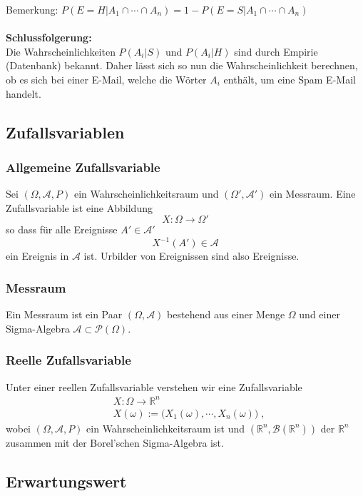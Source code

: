 \documentclass[a4paper]{article}
\begin{document}
Bemerkung: $P(E=H |  A_1 \cap \cdots \cap A_n) = 1- P(E=S |  A_1 \cap \cdots \cap A_n) $\\\\
\textbf{Schlussfolgerung:}\\
Die Wahrscheinlichkeiten $P(A_i | S)$ und $P(A_i | H) $ sind durch Empirie (Datenbank) bekannt. Daher lässt sich so nun die Wahrscheinlichkeit berechnen, ob es sich bei einer E-Mail, welche die Wörter $A_i$ enthält, um eine Spam E-Mail handelt.


\subsection{Zufallsvariablen}

\subsubsection{Allgemeine Zufallsvariable}
Sei $(\Omega, \mathcal{A}, P)$ ein Wahrscheinlichkeitsraum und $(\Omega', \mathcal{A}')$ ein Messraum. Eine Zufallsvariable ist eine Abbildung
$$X : \Omega \to \Omega'$$ 
so dass für alle Ereignisse $A' \in  \mathcal{A}'$
$$ X^{-1} (A') \in \mathcal{A}$$
 ein Ereignis in $\mathcal{A}$ ist. Urbilder von Ereignissen sind also Ereignisse.

\subsubsection{Messraum}
Ein Messraum ist ein Paar $(\Omega, \mathcal{A})$ bestehend aus einer Menge $\Omega$ und einer Sigma-Algebra $\mathcal{A} \subset \mathcal{P}(\Omega)$.

\subsubsection{Reelle Zufallsvariable}
Unter einer reellen Zufallsvariable verstehen wir eine Zufallsvariable 
\begin{align*}
& X : \Omega \to \mathbb{R}^n \\
& X(\omega) := \biggl(X_1(\omega), \cdots , X_n(\omega)  \biggr) \; ,
\end{align*}
wobei $(\Omega, \mathcal{A}, P)$ ein Wahrscheinlichkeitsraum ist und $(\mathbb{R}^n, \mathcal{B}(\mathbb{R}^n))$ der $\mathbb{R}^n$ zusammen mit der Borel'schen Sigma-Algebra ist.

\pagebreak
\subsection{Erwartungswert}
\end{document}
